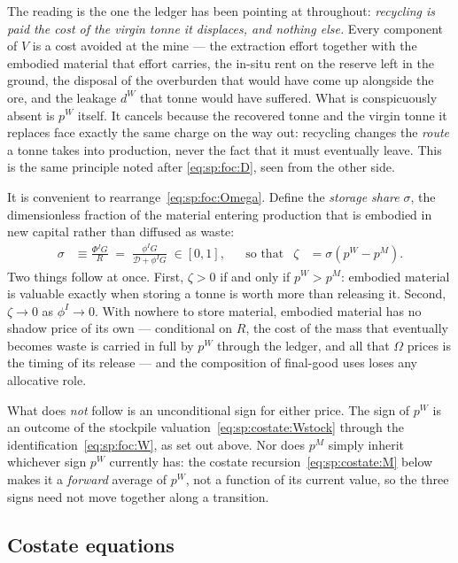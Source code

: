 The reading is the one the ledger has been pointing at throughout: \emph{recycling is paid the cost
of the virgin tonne it displaces, and nothing else.} Every component of $V$ is a cost avoided at the
mine --- the extraction effort together with the embodied material that effort carries, the in-situ
rent on the reserve left in the ground, the disposal of the overburden that would have come up
alongside the ore, and the leakage $d^W$ that tonne would have suffered. What is conspicuously
absent is $p^W$ itself. It cancels because the recovered tonne and the virgin tonne it replaces face
exactly the same charge on the way out: recycling changes the \emph{route} a tonne takes into
production, never the fact that it must eventually leave. This is the same principle noted after
\eqref{eq:sp:foc:D}, seen from the other side.


 It is convenient to rearrange~\eqref{eq:sp:foc:Omega}. Define the \emph{storage share} $\sigma$, the dimensionless fraction of the material entering production that is embodied in new capital rather than diffused as waste:
\begin{align}
\sigma &\equiv \frac{\Phi^IG}{R} \;=\; \frac{\phi^IG}{\mathcal D+\phi^IG}\;\in\left[0,1\right],
&&\text{so that}
&
\zeta &= \sigma\left(p^W-p^M\right).
\label{eq:sp:zeta-explicit}
\end{align}
Two things follow at once. First, $\zeta>0$ if and only if $p^W>p^M$: embodied material is valuable exactly when storing a tonne is worth more than releasing it. Second, $\zeta\to0$ as $\phi^I\to0$. With nowhere to store material, embodied material has no shadow price of its own --- conditional on $R$, the cost of the mass that eventually becomes waste is carried in full by $p^W$ through the ledger, and all that $\Omega$ prices is the timing of its release --- and the composition of final-good uses loses any allocative role.

What does \emph{not} follow is an unconditional sign for either price. The sign of $p^W$ is an outcome of the stockpile valuation~\eqref{eq:sp:costate:Wstock} through the identification~\eqref{eq:sp:foc:W}, as set out above. Nor does $p^M$ simply inherit whichever sign $p^W$ currently has: the costate recursion~\eqref{eq:sp:costate:M} below makes it a \emph{forward} average of $p^W$, not a function of its current value, so the three signs need not move together along a transition.

\subsection{Costate equations}\label{sec:app:sp:costates}

